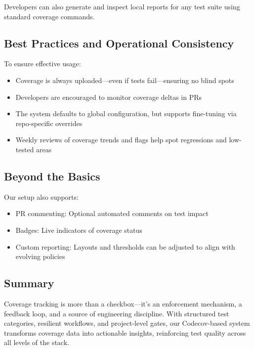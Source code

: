 \documentclass{article}
\begin{document}
Developers can also generate and inspect local reports for any test suite using
standard coverage commands.

\subsection{Best Practices and Operational Consistency}

To ensure effective usage:

\begin{itemize}

  \item Coverage is always uploaded---even if tests fail---ensuring no blind spots

  \item Developers are encouraged to monitor coverage deltas in PRs

  \item The system defaults to global configuration, but supports fine-tuning
    via repo-specific overrides

  \item Weekly reviews of coverage trends and flags help spot regressions and low-tested
    areas
\end{itemize}

\subsection{Beyond the Basics}

Our setup also supports:

\begin{itemize}

  \item PR commenting: Optional automated comments on test impact

  \item Badges: Live indicators of coverage status

  \item Custom reporting: Layouts and thresholds can be adjusted to align with
    evolving policies
\end{itemize}

\subsection{Summary}

Coverage tracking is more than a checkbox---it's an enforcement mechanism, a
feedback loop, and a source of engineering discipline. With structured test
categories, resilient workflows, and project-level gates, our Codecov-based system
transforms coverage data into actionable insights, reinforcing test quality
across all levels of the stack.
\end{document}
